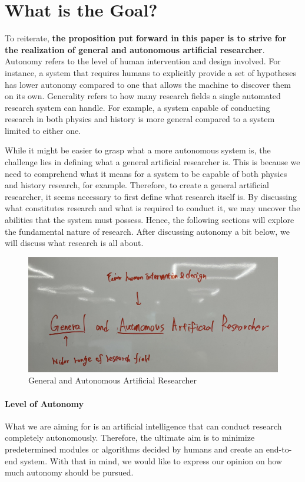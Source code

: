 \chapter{What is the Goal?}
\label{chapter-what-is-research}

To reiterate, \textbf{the proposition put forward in this paper is to strive for the realization of general and autonomous artificial researcher}. Autonomy refers to the level of human intervention and design involved. For instance, a system that requires humans to explicitly provide a set of hypotheses has lower autonomy compared to one that allows the machine to discover them on its own.  Generality refers to how many research fields a single automated research system can handle. For example, a system capable of conducting research in both physics and history is more general compared to a system limited to either one.

While it might be easier to grasp what a more autonomous system is, the challenge lies in defining what a general artificial researcher is. This is because we need to comprehend what it means for a system to be capable of both physics and history research, for example. Therefore, to create a general artificial researcher, it seems necessary to first define what research itself is. By discussing what constitutes research and what is required to conduct it, we may uncover the abilities that the system must possess. Hence, the following sections will explore the fundamental nature of research. After discussing autonomy a bit below, we will discuss what research is all about.

\begin{figure}[htb]
    \centering
    \includegraphics[width=\linewidth]{figs/goal.jpg}
    \caption{General and Autonomous Artificial Researcher}
    \label{fig:goal}
\end{figure}

\subsubsection{Level of Autonomy}
What we are aiming for is an artificial intelligence that can conduct research completely autonomously. Therefore, the ultimate aim is to minimize predetermined modules or algorithms decided by humans and create an end-to-end system. With that in mind, we would like to express our opinion on how much autonomy should be pursued.

